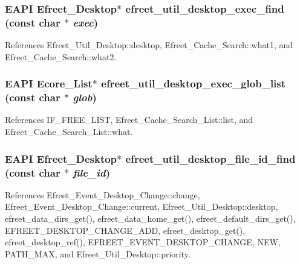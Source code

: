 \subsubsection[efreet\_\-util\_\-desktop\_\-exec\_\-find]{\setlength{\rightskip}{0pt plus 5cm}EAPI {\bf Efreet\_\-Desktop}$\ast$ efreet\_\-util\_\-desktop\_\-exec\_\-find (const char $\ast$ {\em exec})}\label{efreet__utils_8h_57cc0bf2b575e2e61d6a6964497b7cd7}




References Efreet\_\-Util\_\-Desktop::desktop, Efreet\_\-Cache\_\-Search::what1, and Efreet\_\-Cache\_\-Search::what2.
\subsubsection[efreet\_\-util\_\-desktop\_\-exec\_\-glob\_\-list]{\setlength{\rightskip}{0pt plus 5cm}EAPI Ecore\_\-List$\ast$ efreet\_\-util\_\-desktop\_\-exec\_\-glob\_\-list (const char $\ast$ {\em glob})}\label{efreet__utils_8h_7c89ed2bc708f7be50910457399fe5e6}




References IF\_\-FREE\_\-LIST, Efreet\_\-Cache\_\-Search\_\-List::list, and Efreet\_\-Cache\_\-Search\_\-List::what.
\subsubsection[efreet\_\-util\_\-desktop\_\-file\_\-id\_\-find]{\setlength{\rightskip}{0pt plus 5cm}EAPI {\bf Efreet\_\-Desktop}$\ast$ efreet\_\-util\_\-desktop\_\-file\_\-id\_\-find (const char $\ast$ {\em file\_\-id})}\label{efreet__utils_8h_151ee6458631eeaf609a337325b7edee}




References Efreet\_\-Event\_\-Desktop\_\-Change::change, Efreet\_\-Event\_\-Desktop\_\-Change::current, Efreet\_\-Util\_\-Desktop::desktop, efreet\_\-data\_\-dirs\_\-get(), efreet\_\-data\_\-home\_\-get(), efreet\_\-default\_\-dirs\_\-get(), EFREET\_\-DESKTOP\_\-CHANGE\_\-ADD, efreet\_\-desktop\_\-get(), efreet\_\-desktop\_\-ref(), EFREET\_\-EVENT\_\-DESKTOP\_\-CHANGE, NEW, PATH\_\-MAX, and Efreet\_\-Util\_\-Desktop::priority.
